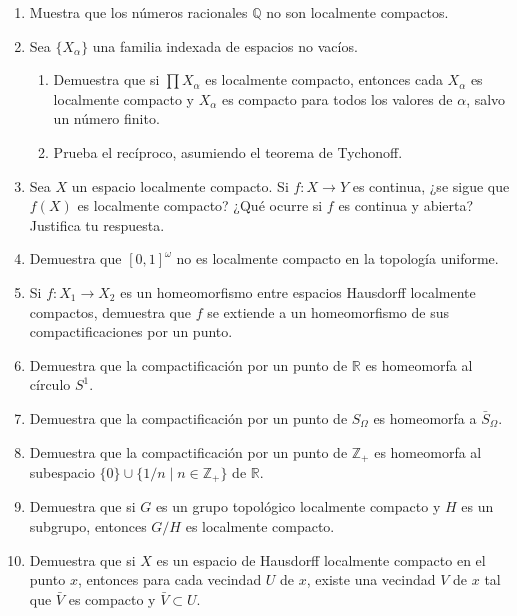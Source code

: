 \documentclass[11pt]{article}
\begin{document}
\begin{enumerate}
    \item Muestra que los números racionales $\mathbb{Q}$ no son localmente compactos.

    \item Sea $\{X_\alpha\}$ una familia indexada de espacios no vacíos.
    \begin{enumerate}
        \item Demuestra que si $\prod X_\alpha$ es localmente compacto, entonces cada $X_\alpha$ es localmente compacto y $X_\alpha$ es compacto para todos los valores de $\alpha$, salvo un número finito.
        \item Prueba el recíproco, asumiendo el teorema de Tychonoff.
    \end{enumerate}

    \item Sea $X$ un espacio localmente compacto. Si $f: X \rightarrow Y$ es continua, ¿se sigue que $f(X)$ es localmente compacto? ¿Qué ocurre si $f$ es continua y abierta? Justifica tu respuesta.

    \item Demuestra que $[0,1]^\omega$ no es localmente compacto en la topología uniforme.

    \item Si $f: X_1 \rightarrow X_2$ es un homeomorfismo entre espacios Hausdorff localmente compactos, demuestra que $f$ se extiende a un homeomorfismo de sus compactificaciones por un punto.

    \item Demuestra que la compactificación por un punto de $\mathbb{R}$ es homeomorfa al círculo $S^1$.

    \item Demuestra que la compactificación por un punto de $S_{\Omega}$ es homeomorfa a $\bar{S}_{\Omega}$.

    \item Demuestra que la compactificación por un punto de $\mathbb{Z}_{+}$ es homeomorfa al subespacio $\{0\} \cup \{1 / n \mid n \in \mathbb{Z}_{+}\}$ de $\mathbb{R}$.

    \item Demuestra que si $G$ es un grupo topológico localmente compacto y $H$ es un subgrupo, entonces $G / H$ es localmente compacto.

    \item Demuestra que si $X$ es un espacio de Hausdorff localmente compacto en el punto $x$, entonces para cada vecindad $U$ de $x$, existe una vecindad $V$ de $x$ tal que $\bar{V}$ es compacto y $\bar{V} \subset U$.
\end{enumerate}
\end{document}
